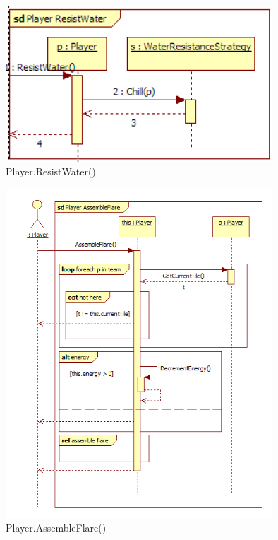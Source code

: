 \begin{figure}[H]
	\begin{center}
		\includegraphics[width=10cm]{chapters/chapter04/seqdiag/Player_ResistWater.png}
		\caption{Player.ResistWater()}
		\label{fig:PlayerResistWater}
	\end{center}
\end{figure}
\begin{figure}[H]
	\begin{center}
		\includegraphics[width=10cm]{chapters/chapter04/seqdiag/Player_AssembleFlare.png}
		\caption{Player.AssembleFlare()}
		\label{fig:PlayerAssembleFlare}
	\end{center}
\end{figure}

